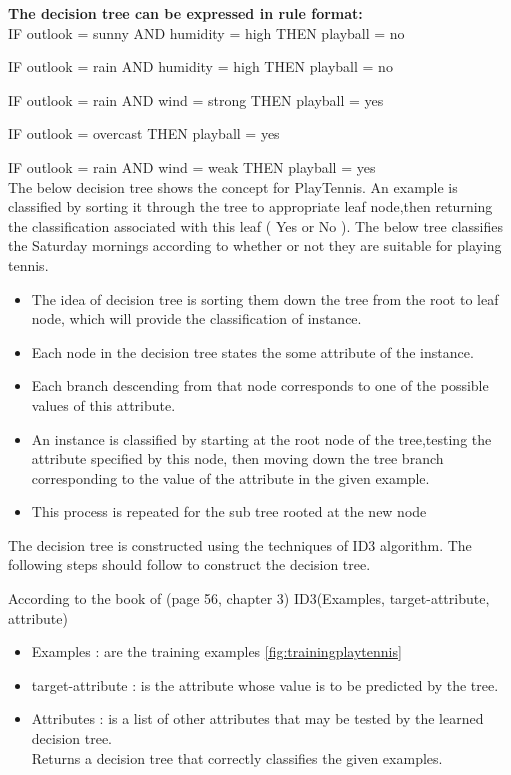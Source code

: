 \documentclass{report}
\begin{document}
{\bf The decision tree can be expressed in rule format:}\\	

IF outlook = sunny AND humidity = high THEN playball = no

IF outlook = rain AND humidity = high THEN playball = no

IF outlook = rain AND wind = strong THEN playball = yes

IF outlook = overcast THEN playball = yes

IF outlook = rain AND wind = weak THEN playball = yes\\

The below decision tree shows the concept for PlayTennis. An example is classified by sorting it through the tree to appropriate leaf node,then returning the classification associated with this leaf ( Yes or No ). The below tree classifies the Saturday mornings according to whether or not they are suitable for playing tennis.

\begin{itemize}

\item The idea of decision tree is sorting them down the tree from the root to leaf node, which will provide the classification of instance.
\item Each node in the decision tree states the some attribute of the instance.
\item Each branch descending from that node corresponds to one of the possible values of this attribute.
\item An instance is classified by starting at the root node of the tree,testing the attribute specified by this node, then moving down the tree branch corresponding to the value of the attribute in the given example.
\item This process is repeated for the sub tree rooted at the new node

\end{itemize}

The decision tree is constructed using the techniques of ID3 algorithm. The following steps should follow to construct the decision tree.

According to the book of \cite{Mitchell1997MachineLearning} (page 56, chapter 3) ID3(Examples, target-attribute, attribute)
\begin{itemize}
\item Examples : are the training examples \ref{fig:trainingplaytennis}
\item target-attribute : is the attribute whose value is to be predicted by the tree.
\item Attributes : is a list of other attributes that may be tested by the learned decision tree.\\
Returns a decision tree that correctly classifies the given examples.\\
\end{itemize}
\end{document}
